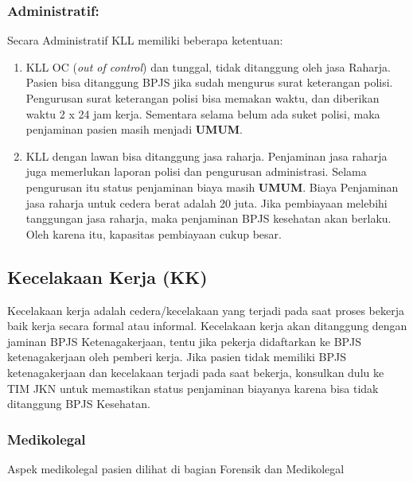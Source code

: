 \documentclass[
]{book}
\begin{document}
\hypertarget{administratif}{%
\subsubsection{Administratif:}\label{administratif}}

Secara Administratif KLL memiliki beberapa ketentuan:

\begin{enumerate}
\def\labelenumi{\arabic{enumi}.}
\item
  KLL OC (\emph{out of control}) dan tunggal, tidak ditanggung oleh jasa Raharja. Pasien bisa ditanggung BPJS jika sudah mengurus surat keterangan polisi. Pengurusan surat keterangan polisi bisa memakan waktu, dan diberikan waktu 2 x 24 jam kerja. Sementara selama belum ada suket polisi, maka penjaminan pasien masih menjadi \textbf{UMUM}.
\item
  KLL dengan lawan bisa ditanggung jasa raharja. Penjaminan jasa raharja juga memerlukan laporan polisi dan pengurusan administrasi. Selama pengurusan itu status penjaminan biaya masih \textbf{UMUM}. Biaya Penjaminan jasa raharja untuk cedera berat adalah 20 juta. Jika pembiayaan melebihi tanggungan jasa raharja, maka penjaminan BPJS kesehatan akan berlaku. Oleh karena itu, kapasitas pembiayaan cukup besar.
\end{enumerate}

\hypertarget{kecelakaan-kerja-kk}{%
\subsection{Kecelakaan Kerja (KK)}\label{kecelakaan-kerja-kk}}

Kecelakaan kerja adalah cedera/kecelakaan yang terjadi pada saat proses bekerja baik kerja secara formal atau informal.
Kecelakaan kerja akan ditanggung dengan jaminan BPJS Ketenagakerjaan, tentu jika pekerja didaftarkan ke BPJS ketenagakerjaan oleh pemberi kerja. Jika pasien tidak memiliki BPJS ketenagakerjaan dan kecelakaan terjadi pada saat bekerja, konsulkan dulu ke TIM JKN untuk memastikan status penjaminan biayanya karena bisa tidak ditanggung BPJS Kesehatan.

\hypertarget{medikolegal}{%
\subsubsection{Medikolegal}\label{medikolegal}}

Aspek medikolegal pasien dilihat di bagian Forensik dan Medikolegal
\end{document}
